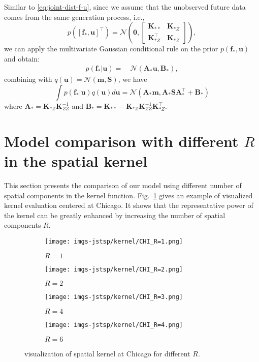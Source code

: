 \documentclass[journal]{IEEEtran}
\begin{document}
Similar to \eqref{eq:joint-dist-f-u}, since we assume that the unobserved future data comes from the same generation process, i.e., 
\[
    p([\mathbf{f}_*, \mathbf{u}]^\top) = \mathcal{N}\left(
    \mathbf{0},
    \begin{bmatrix}
    \mathbf{K}_{**} & \mathbf{K}_{*Z} \\
    \mathbf{K}_{*Z}^\top & \mathbf{K}_{*Z}
    \end{bmatrix}
    \right),
\]
we can apply the multivariate Gaussian conditional rule on the prior $p(\mathbf{f}_*, \mathbf{u})$ and obtain:
\begin{align*}
    p(\mathbf{f}_* | \mathbf{u})
    = &~\mathcal{N}(\mathbf{A}_* \mathbf{u}, \mathbf{B}_*),
\end{align*}
combining with $q(\mathbf{u}) = \mathcal{N}(\mathbf{m}, \mathbf{S})$, we have
\[
\int p(\mathbf{f}_* | \mathbf{u}) q(\mathbf{u}) d \mathbf{u} = \mathcal{N}(\mathbf{A}_* \mathbf{m}, \mathbf{A}_* \mathbf{S} \mathbf{A}_*^\top + \mathbf{B}_*)
\]
where $\mathbf{A}_* = \mathbf{K}_{*Z}\mathbf{K}_{ZZ}^{-1}$ and $\mathbf{B}_* = \mathbf{K}_{**} - \mathbf{K}_{*Z} \mathbf{K}_{ZZ}^{-1} \mathbf{K}_{*Z}^\top$.




\section{Model comparison with different $R$ in the spatial kernel}
\label{append:comp-r-exp-results}

This section presents the comparison of our model using different number of spatial components in the kernel function. Fig.~\ref{fig:cv-delta} gives an example of visualized kernel evaluation centered at Chicago. It shows that the representative power of the kernel can be greatly enhanced by increasing the number of spatial components $R$.

\begin{figure}[h!]
\centering
\begin{subfigure}[h]{0.45\linewidth}
\texttt{[image: imgs-jstsp/kernel/CHI\_R=1.png]}
\caption{$R=1$}
\end{subfigure}
\begin{subfigure}[h]{0.45\linewidth}
\texttt{[image: imgs-jstsp/kernel/CHI\_R=2.png]}
\caption{$R=2$}
\end{subfigure}
\vfill
\begin{subfigure}[h]{0.45\linewidth}
\texttt{[image: imgs-jstsp/kernel/CHI\_R=3.png]}
\caption{$R=4$}
\end{subfigure}
\begin{subfigure}[h]{0.45\linewidth}
\texttt{[image: imgs-jstsp/kernel/CHI\_R=4.png]}
\caption{$R=6$}
\end{subfigure}
\caption{visualization of spatial kernel at Chicago for different $R$.}
\label{fig:cv-delta}
\end{figure}
\end{document}
